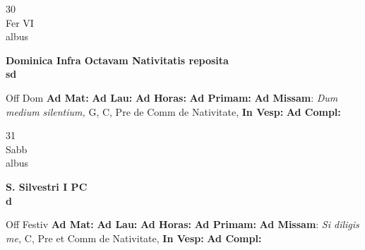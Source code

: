\documentclass[10pt, openany]{book}
\begin{document}
        \begin{center}
            \begin{minipage}{3.5in}
                \vspace{2em}
                \begin{minipage}{0.5in}
                    {\Huge 30} \\
                    {\normalsize Fer VI} \\
                    {\normalsize albus}
                \end{minipage}
                \begin{minipage}{3.0in}
                    \textbf{ \large Dominica Infra Octavam Nativitatis reposita \\
                    \textnormal{\normalsize sd}} \\ 
                \end{minipage}
                \begin{justify}Off Dom
                    \textbf{Ad Mat: }
                    \textbf{Ad Lau: }
                    \textbf{Ad Horas: }
                    \textbf{Ad Primam: }\textbf{Ad Missam}: \textit{Dum medium silentium,} G, C, Pre de Comm de Nativitate,  
                    \textbf{In Vesp: }
                    \textbf{Ad Compl: }
                \end{justify}
            \end{minipage}
        \end{center}
    
        \begin{center}
            \begin{minipage}{3.5in}
                \vspace{2em}
                \begin{minipage}{0.5in}
                    {\Huge 31} \\
                    {\normalsize Sabb} \\
                    {\normalsize albus}
                \end{minipage}
                \begin{minipage}{3.0in}
                    \textbf{ \large S. Silvestri I PC \\
                    \textnormal{\normalsize d}} \\ 
                \end{minipage}
                \begin{justify}Off Festiv
                    \textbf{Ad Mat: }
                    \textbf{Ad Lau: }
                    \textbf{Ad Horas: }
                    \textbf{Ad Primam: }\textbf{Ad Missam}: \textit{Si diligis me,} C, Pre et Comm de Nativitate,  
                    \textbf{In Vesp: }
                    \textbf{Ad Compl: }
                \end{justify}
            \end{minipage}
        \end{center}
    
\end{document}
